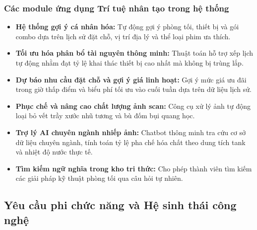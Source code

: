 \subsubsection{Các module ứng dụng Trí tuệ nhân tạo trong hệ thống}
\begin{itemize}[leftmargin=2em]
    \item \textbf{Hệ thống gợi ý cá nhân hóa:} Tự động gợi ý phòng tối, thiết bị và gói combo dựa trên lịch sử đặt chỗ, vị trí địa lý và thể loại phim ưa thích.
    \item \textbf{Tối ưu hóa phân bổ tài nguyên thông minh:} Thuật toán hỗ trợ xếp lịch tự động nhằm đạt tỷ lệ khai thác thiết bị cao nhất mà không bị trùng lắp.
    \item \textbf{Dự báo nhu cầu đặt chỗ và gợi ý giá linh hoạt:} Gợi ý mức giá ưu đãi trong giờ thấp điểm và biểu phí tối ưu vào cuối tuần dựa trên dữ liệu lịch sử.
    \item \textbf{Phục chế và nâng cao chất lượng ảnh scan:} Công cụ xử lý ảnh tự động loại bỏ vết trầy xước nhũ tương và bù đốm bụi quang học.
    \item \textbf{Trợ lý AI chuyên ngành nhiếp ảnh:} Chatbot thông minh tra cứu cơ sở dữ liệu chuyên ngành, tính toán tỷ lệ pha chế hóa chất theo dung tích tank và nhiệt độ nước thực tế.
    \item \textbf{Tìm kiếm ngữ nghĩa trong kho tri thức:} Cho phép thành viên tìm kiếm các giải pháp kỹ thuật phòng tối qua câu hỏi tự nhiên.
\end{itemize}

\subsection{Yêu cầu phi chức năng và Hệ sinh thái công nghệ}

